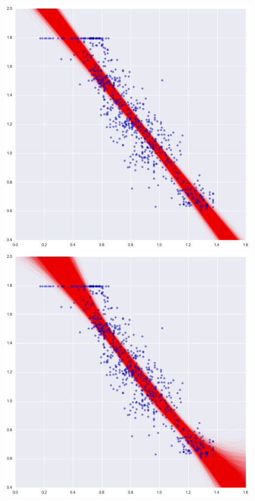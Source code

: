 \documentclass[aspectratio=169]{beamer}
\begin{document}
\begin{frame}

\begin{center}
\includegraphics[height=0.55\textheight]{images/lr_fit.png}
\includegraphics[height=0.55\textheight]{images/qr_fit.png}

\end{center}
\end{frame}
\end{document}
